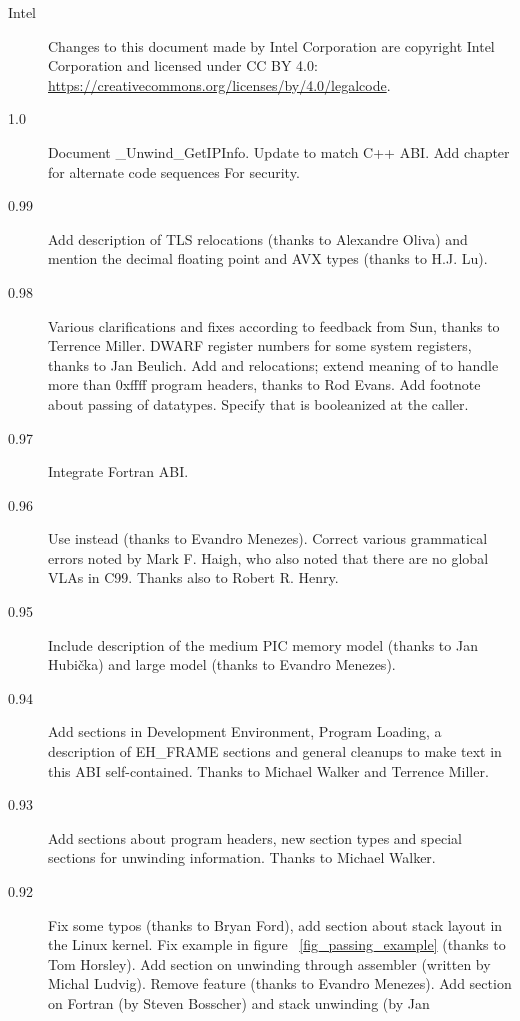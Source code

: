 \documentclass[12pt]{report}
\begin{document}
\begin{description}


\item[Intel] Changes to this document made by Intel Corporation are
 copyright Intel Corporation and licensed under CC BY 4.0:
 \url{https://creativecommons.org/licenses/by/4.0/legalcode}.
\item[1.0] Document _Unwind_GetIPInfo.  Update to match C++ ABI.  Add
  chapter for alternate code sequences For security.
\item[0.99] Add description of TLS relocations (thanks to Alexandre
  Oliva) and mention the decimal floating point and AVX types (thanks to
  H.J. Lu).
\item[0.98] Various clarifications and fixes according to feedback
  from Sun, thanks to Terrence Miller.  DWARF register numbers for some
  system registers, thanks to Jan Beulich.  Add  and
   relocations; extend meaning of 
  to handle more than 0xffff program headers, thanks to Rod Evans.
  Add footnote about passing of  datatypes. 
  Specify that  is booleanized at the caller.
\item[0.97] Integrate Fortran ABI.
\item[0.96] Use  instead 
  (thanks to Evandro Me\-ne\-zes).  Correct various grammatical errors
  noted by Mark F. Haigh, who also noted that there are no global VLAs
  in C99.  Thanks also to Robert R. Henry.
\item[0.95] Include description of the medium PIC memory model (thanks
  to Jan Hubi\v{c}ka) and large model (thanks to Evandro Menezes).
\item[0.94] Add sections in Development Environment, Program Loading,
  a description of EH_FRAME sections and general cleanups to make
  text in this ABI self-contained.  Thanks to Michael Walker and Terrence
  Miller.
\item[0.93] Add sections about program headers, new section types and
  special sections for unwinding information.  Thanks to Michael
  Walker.
\item[0.92] Fix some typos (thanks to Bryan Ford), add section about
  stack layout in the Linux kernel.  Fix example in figure~
  \ref{fig_passing_example} (thanks to Tom Horsley).  Add section on
  unwinding through assembler (written by Michal Ludvig).  Remove
   feature (thanks to Evandro Menezes).  Add section on
  Fortran (by Steven Bosscher) and stack unwinding (by Jan

\end{description}
\end{document}
